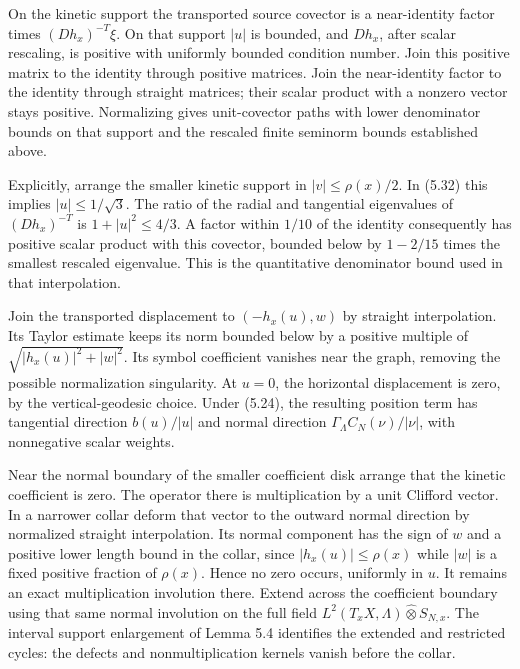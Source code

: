\documentclass[
  11pt,
]{article}
\begin{document}
On the kinetic support the transported source covector is a
near-identity factor times \((Dh_x)^{-T}\xi\). On that support \(|u|\)
is bounded, and \(Dh_x\), after scalar rescaling, is positive with
uniformly bounded condition number. Join this positive matrix to the
identity through positive matrices. Join the near-identity factor to the
identity through straight matrices; their scalar product with a nonzero
vector stays positive. Normalizing gives unit-covector paths with lower
denominator bounds on that support and the rescaled finite seminorm
bounds established above.

Explicitly, arrange the smaller kinetic support in \(|v|\leq\rho(x)/2\).
In (5.32) this implies \(|u|\leq1/\sqrt3\). The ratio of the radial and
tangential eigenvalues of \((Dh_x)^{-T}\) is \(1+|u|^2\leq4/3\). A
factor within \(1/10\) of the identity consequently has positive scalar
product with this covector, bounded below by \(1-2/15\) times the
smallest rescaled eigenvalue. This is the quantitative denominator bound
used in that interpolation.

Join the transported displacement to \((-h_x(u),w)\) by straight
interpolation. Its Taylor estimate keeps its norm bounded below by a
positive multiple of \(\sqrt{|h_x(u)|^2+|w|^2}\). Its symbol coefficient
vanishes near the graph, removing the possible normalization
singularity. At \(u=0\), the horizontal displacement is zero, by the
vertical-geodesic choice. Under (5.24), the resulting position term has
tangential direction \(b(u)/|u|\) and normal direction
\(\Gamma_\Lambda C_N(\nu)/|\nu|\), with nonnegative scalar weights.

Near the normal boundary of the smaller coefficient disk arrange that
the kinetic coefficient is zero. The operator there is multiplication by
a unit Clifford vector. In a narrower collar deform that vector to the
outward normal direction by normalized straight interpolation. Its
normal component has the sign of \(w\) and a positive lower length bound
in the collar, since \(|h_x(u)|\leq\rho(x)\) while \(|w|\) is a fixed
positive fraction of \(\rho(x)\). Hence no zero occurs, uniformly in
\(u\). It remains an exact multiplication involution there. Extend
across the coefficient boundary using that same normal involution on the
full field \(L^2(T_xX,\Lambda)\widehat\otimes S_{N,x}\). The interval
support enlargement of Lemma 5.4 identifies the extended and restricted
cycles: the defects and nonmultiplication kernels vanish before the
collar.
\end{document}
